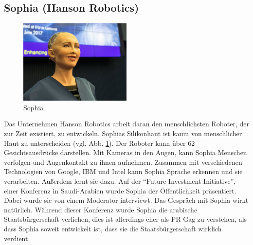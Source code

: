 \subsection{Sophia (Hanson Robotics)}
\begin{figure}
  \centering
     \includegraphics[width=0.5\textwidth]{sophia}
  \caption{Sophia}
  \label{fig:sophia}
\end{figure}
Das Unternehmen Hanson Robotics arbeit daran den menschlichsten Roboter, der zur
Zeit existiert, zu entwickeln. Sophias Silikonhaut ist kaum von menschlicher
Haut zu unterscheiden (vgl. Abb. \ref{fig:sophia}). Der Roboter kann über 62
Gesichtsausdrücke darstellen.
Mit Kameras in den Augen, kann Sophia Menschen verfolgen und Augenkontakt zu
ihnen aufnehmen. Zusammen mit verschiedenen Technologien von Google, IBM und
Intel kann Sophia Sprache erkennen und sie verarbeiten. Außerdem lernt sie
dazu. \cite{Harriet2016} Auf der "`Future Investment Initiative"', einer
Konferenz in Saudi-Arabien wurde Sophia der Öffentlichkeit präsentiert. Dabei
wurde sie von einem Moderator interviewt. Das Gespräch mit Sophia wirkt
natürlich. Während dieser Konferenz wurde Sophia die arabische
Staatsbürgerschaft verliehen, dies ist allerdings eher als PR-Gag zu verstehen,
als dass Sophia soweit entwickelt ist, dass sie die Staatsbürgerschaft wirklich
verdient. \cite{Welt2017}

